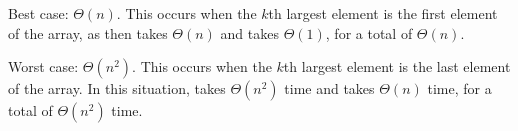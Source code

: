 \begin{prob}
\begin{subprobset}
\begin{subprob}
            \begin{soln}
                Best case: $\Theta(n)$. This occurs when the $k$th largest element is the first element of the array,
                as then  takes $\Theta(n)$ and  takes $\Theta(1)$,
                for a total of $\Theta(n)$.

                Worst case: $\Theta(n^2)$. This occurs when the $k$th largest element is the last element of the
                array. In this situation,  takes $\Theta(n^2)$ time and 
                takes $\Theta(n)$ time, for a total of $\Theta(n^2)$ time.
            \end{soln}
        \end{subprob}

    \end{subprobset}


\end{prob}
